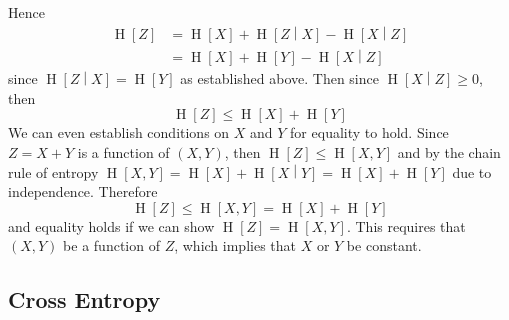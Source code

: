 \documentclass[11pt]{report} %
\begin{document}
Hence
\begin{align}
\operatorname{H}\left[Z\right] &= \operatorname{H}\left[X\right] + \operatorname{H}\left[Z\middle|X\right] - \operatorname{H}\left[X\middle| Z\right] \\
&= \operatorname{H}\left[X\right] + \operatorname{H}\left[Y\right] - \operatorname{H}\left[X\middle| Z\right]
\end{align}
since $\operatorname{H}\left[Z\middle|X\right] = \operatorname{H}\left[Y\right]$ as established above. Then since $\operatorname{H}\left[X\middle| Z\right] \geq 0$, then
\begin{equation}
\operatorname{H}\left[Z\right] \leq \operatorname{H}\left[X\right] + \operatorname{H}\left[Y\right]
\end{equation}
We can even establish conditions on $X$ and $Y$ for equality to hold. Since $Z = X + Y$ is a function of $\left(X, Y\right)$, then $\operatorname{H}\left[Z\right] \leq \operatorname{H}\left[X, Y\right]$ and by the chain rule of entropy $\operatorname{H}\left[X, Y\right] = \operatorname{H}\left[X\right] + \operatorname{H}\left[X\middle| Y\right] = \operatorname{H}\left[X\right] + \operatorname{H}\left[Y\right]$ due to independence. Therefore
\begin{equation}
\operatorname{H}\left[Z\right] \leq \operatorname{H}\left[X, Y\right] = \operatorname{H}\left[X\right] + \operatorname{H}\left[Y\right]
\end{equation}
and equality holds if we can show $\operatorname{H}\left[Z\right] = \operatorname{H}\left[X, Y\right]$. This requires that $\left(X, Y\right)$ be a function of $Z$, which implies that $X$ or $Y$ be constant.

\subsection{Cross Entropy}
\end{document}
